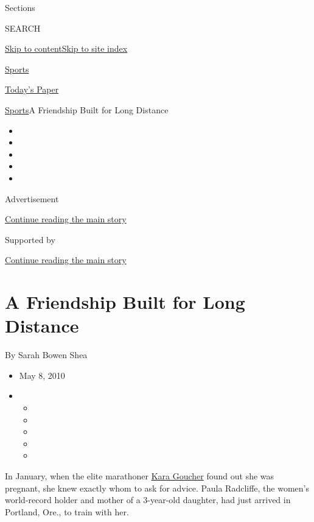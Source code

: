 Sections

SEARCH

\protect\hyperlink{site-content}{Skip to
content}\protect\hyperlink{site-index}{Skip to site index}

\href{https://www.nytimes3xbfgragh.onion/section/sports}{Sports}

\href{https://myaccount.nytimes3xbfgragh.onion/auth/login?response_type=cookie\&client_id=vi}{}

\href{https://www.nytimes3xbfgragh.onion/section/todayspaper}{Today's
Paper}

\href{/section/sports}{Sports}\textbar{}A Friendship Built for Long
Distance

\begin{itemize}
\item
\item
\item
\item
\item
\end{itemize}

Advertisement

\protect\hyperlink{after-top}{Continue reading the main story}

Supported by

\protect\hyperlink{after-sponsor}{Continue reading the main story}

\hypertarget{a-friendship-built-for-long-distance}{%
\section{A Friendship Built for Long
Distance}\label{a-friendship-built-for-long-distance}}

By Sarah Bowen Shea

\begin{itemize}
\item
  May 8, 2010
\item
  \begin{itemize}
  \item
  \item
  \item
  \item
  \item
  \end{itemize}
\end{itemize}

In January, when the elite marathoner
\href{http://www.usatf.org/athletes/bios/Grgas-Wheeler_Kara.asp}{Kara
Goucher} found out she was pregnant, she knew exactly whom to ask for
advice. Paula Radcliffe, the women's world-record holder and mother of a
3-year-old daughter, had just arrived in Portland, Ore., to train with
her.

